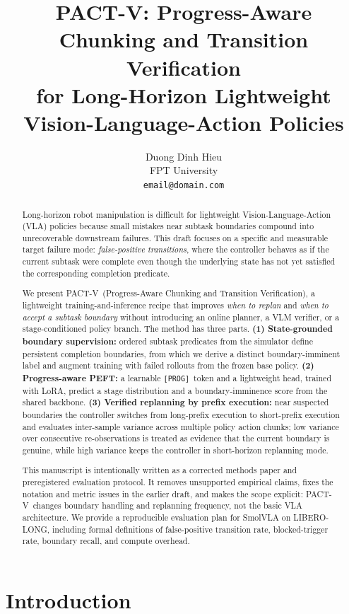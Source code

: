 \documentclass[10pt]{article}
\title{\vspace{-0.7em}
\textbf{PACT-V: Progress-Aware Chunking and Transition Verification\\
for Long-Horizon Lightweight Vision-Language-Action Policies}
\vspace{-0.4em}}
\author{Duong Dinh Hieu\\FPT University\\\texttt{email@domain.com}}
\date{}
\newcommand{\method}{\textsc{PACT-V}\xspace}
\newcommand{\methodlong}{Progress-Aware Chunking and Transition Verification\xspace}
\newcommand{\progtok}{\texttt{[PROG]}}
\begin{document}
\maketitle

\begin{abstract}
Long-horizon robot manipulation is difficult for lightweight
Vision-Language-Action (VLA) policies because small mistakes near subtask
boundaries compound into unrecoverable downstream failures.
This draft focuses on a specific and measurable target failure mode:
\emph{false-positive transitions}, where the controller behaves as if the
current subtask were complete even though the underlying state has not yet
satisfied the corresponding completion predicate.

We present \method\ (\methodlong), a lightweight training-and-inference
recipe that improves \emph{when to replan} and \emph{when to accept a subtask
boundary} without introducing an online planner, a VLM verifier, or a
stage-conditioned policy branch.
The method has three parts.
\textbf{(1) State-grounded boundary supervision:}
ordered subtask predicates from the simulator define persistent completion
boundaries, from which we derive a distinct boundary-imminent label and augment
training with failed rollouts from the frozen base policy.
\textbf{(2) Progress-aware PEFT:}
a learnable \progtok\ token and a lightweight head, trained with LoRA, predict a
stage distribution and a boundary-imminence score from the shared backbone.
\textbf{(3) Verified replanning by prefix execution:}
near suspected boundaries the controller switches from long-prefix execution to
short-prefix execution and evaluates inter-sample variance across multiple
policy action chunks; low variance over consecutive re-observations is treated
as evidence that the current boundary is genuine, while high variance keeps the
controller in short-horizon replanning mode.

This manuscript is intentionally written as a corrected methods paper and
preregistered evaluation protocol.
It removes unsupported empirical claims, fixes the notation and metric issues
in the earlier draft, and makes the scope explicit:
\method\ changes boundary handling and replanning frequency, not the basic VLA
architecture.
We provide a reproducible evaluation plan for SmolVLA on LIBERO-LONG, including
formal definitions of false-positive transition rate, blocked-trigger rate,
boundary recall, and compute overhead.
\end{abstract}

\section{Introduction}
\end{document}
